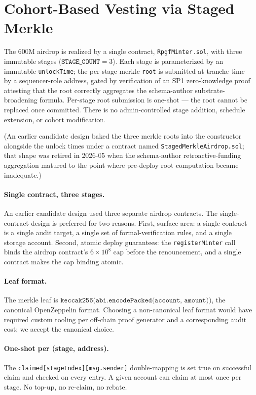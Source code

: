 \documentclass[11pt,a4paper]{article}
\theoremstyle{definition}
\theoremstyle{remark}
\begin{document}
\section{Cohort-Based Vesting via Staged Merkle}
\label{sec:vesting}

The 600M airdrop is realized by a single contract,
\texttt{RpgfMinter.sol}, with three immutable stages
($\texttt{STAGE\_COUNT} = 3$). Each stage is parameterized by an
immutable \texttt{unlockTime}; the per-stage merkle \texttt{root}
is submitted at tranche time by a sequencer-role address, gated
by verification of an SP1 zero-knowledge proof attesting that the
root correctly aggregates the schema-author substrate-broadening
formula. Per-stage root submission is one-shot --- the root
cannot be replaced once committed. There is no admin-controlled
stage addition, schedule extension, or cohort modification.

(An earlier candidate design baked the three merkle roots into
the constructor alongside the unlock times under a contract named
\texttt{StagedMerkleAirdrop.sol}; that shape was retired in
2026-05 when the schema-author retroactive-funding aggregation
matured to the point where pre-deploy root computation became
inadequate.)

\paragraph{Single contract, three stages.}
An earlier candidate design used three separate airdrop
contracts. The single-contract design is preferred for two
reasons. First, surface area: a single contract is a single
audit target, a single set of formal-verification rules, and a
single storage account. Second, atomic deploy guarantees: the
\texttt{registerMinter} call binds the airdrop contract's $6
\times 10^8$ cap before the renouncement, and a single contract
makes the cap binding atomic.

\paragraph{Leaf format.}
The merkle leaf is
$\texttt{keccak256(abi.encodePacked(account, amount))}$, the
canonical OpenZeppelin format. Choosing a non-canonical leaf
format would have required custom tooling per off-chain proof
generator and a corresponding audit cost; we accept the canonical
choice.

\paragraph{One-shot per (stage, address).}
The \texttt{claimed[stageIndex][msg.sender]} double-mapping is
set true on successful claim and checked on every entry. A given
account can claim at most once per stage. No top-up, no
re-claim, no rebate.
\end{document}
